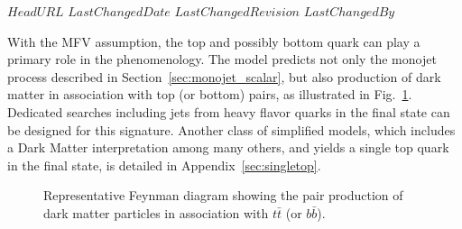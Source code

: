 \svnidlong
{$HeadURL$}
{$LastChangedDate$}
{$LastChangedRevision$}
{$LastChangedBy$}

With the MFV assumption, the top and possibly bottom
quark can play a primary role in the phenomenology.
The model predicts not only
the monojet process described in Section~\ref{sec:monojet_scalar}, but also production of dark matter
in association with top (or bottom) pairs, as illustrated in Fig.~\ref{fig:TTbarPhi}. 
Dedicated searches including jets from heavy flavor quarks in the final state
can be designed for this signature. Another class of simplified models,  
which includes a Dark Matter interpretation among many others, and yields a single
top quark in the final state, is detailed in Appendix~\ref{sec:singletop}. 

\begin{figure}[h!]
\centering
  \textwidth
  \begin{feynmandiagram}[modelTTbarMET]
  \end{feynmandiagram}
\caption{Representative Feynman
diagram showing the pair production of dark matter particles in
association with $t\bar t$ (or $b\bar b$).}
\label{fig:TTbarPhi}
\end{figure}




